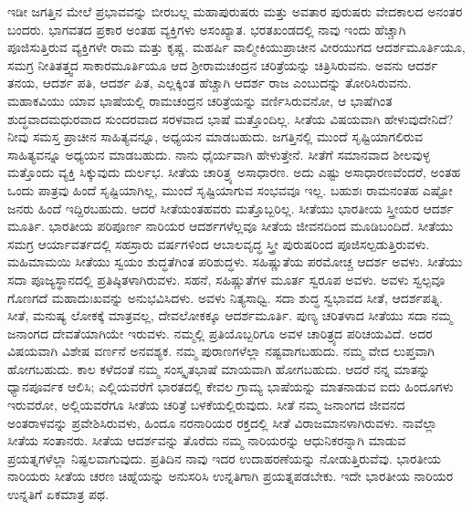 ಇಡೀ ಜಗತ್ತಿನ ಮೇಲೆ ಪ್ರಭಾವವನ್ನು ಬೀರಬಲ್ಲ ಮಹಾಪುರುಷರು ಮತ್ತು ಅವತಾರ ಪುರುಷರು ವೇದಕಾಲದ ಅನಂತರ ಬಂದರು. ಭಾಗವತದ ಪ್ರಕಾರ ಅಂತಹ ವ್ಯಕ್ತಿಗಳು ಅಸಂಖ್ಯಾತ. ಭರತಖಂಡದಲ್ಲಿ ನಾವು ಇಂದು ಹೆಚ್ಚಾಗಿ ಪೂಜಿಸುತ್ತಿರುವ ವ್ಯಕ್ತಿಗಳೇ ರಾಮ ಮತ್ತು ಕೃಷ್ಣ. ಮಹರ್ಷಿ ವಾಲ್ಮೀಕಿಯುಪ್ರಾಚೀನ ವೀರಯುಗದ ಆದರ್ಶಮೂರ್ತಿಯೂ, ಸಮಗ್ರ ನೀತಿತತ್ತ್ವದ ಸಾಕಾರಮೂರ್ತಿಯೂ ಆದ ಶ‍್ರೀರಾಮಚಂದ್ರನ ಚರಿತ್ರೆಯನ್ನು ಚಿತ್ರಿಸಿರುವನು. ಅವನು ಆದರ್ಶ ತನಯ, ಆದರ್ಶ ಪತಿ, ಆದರ್ಶ ಪಿತ, ಎಲ್ಲಕ್ಕಿಂತ ಹೆಚ್ಚಾಗಿ ಆದರ್ಶ ರಾಜ ಎಂಬುದನ್ನು ತೋರಿಸಿರುವನು. ಮಹಾಕವಿಯು ಯಾವ ಭಾಷೆಯಲ್ಲಿ ರಾಮಚಂದ್ರನ ಚರಿತ್ರೆಯನ್ನು ವರ್ಣಿಸಿರುವನೋ, ಆ ಭಾಷೆಗಿಂತ ಶುದ್ಧವಾದ\break ಮಧುರವಾದ ಸುಂದರವಾದ ಸರಳವಾದ ಭಾಷೆ ಮತ್ತೊಂದಿಲ್ಲ. ಸೀತೆಯ ವಿಷಯವಾಗಿ ಹೇಳುವುದೇನಿದೆ? ನೀವು ಸಮಸ್ತ ಪ್ರಾಚೀನ ಸಾಹಿತ್ಯವನ್ನೂ, ಅಧ್ಯಯನ ಮಾಡಬಹುದು. ಜಗತ್ತಿನಲ್ಲಿ ಮುಂದೆ ಸೃಷ್ಟಿಯಾಗಲಿರುವ ಸಾಹಿತ್ಯವನ್ನೂ ಅಧ್ಯಯನ ಮಾಡಬಹುದು. ನಾನು ಧೈರ್ಯವಾಗಿ ಹೇಳುತ್ತೇನೆ. ಸೀತೆಗೆ ಸಮಾನವಾದ ಶೀಲವುಳ್ಳ ಮತ್ತೊಂದು ವ್ಯಕ್ತಿ ಸಿಕ್ಕುವುದು ದುರ್ಲಭ. ಸೀತೆಯ ಚಾರಿತ್ರ್ಯ ಅಸಾಧಾರಣ. ಅದು ಎಷ್ಟು ಅಸಾಧಾರಣವೆಂದರೆ, ಅಂತಹ ಒಂದು ಪಾತ್ರವು ಹಿಂದೆ ಸೃಷ್ಟಿಯಾಗಿಲ್ಲ, ಮುಂದೆ ಸೃಷ್ಟಿಯಾಗುವ ಸಂಭವವೂ ಇಲ್ಲ. ಬಹುಶಃ ರಾಮನಂತಹ ಎಷ್ಟೋ ಜನರು ಹಿಂದೆ ಇದ್ದಿರಬಹುದು. ಆದರೆ ಸೀತೆಯಂತಹವರು ಮತ್ತೊಬ್ಬರಿಲ್ಲ. ಸೀತೆಯು ಭಾರತೀಯ ಸ್ತ್ರೀಯರ ಆದರ್ಶ ಮೂರ್ತಿ. ಭಾರತೀಯ ಪರಿಪೂರ್ಣ ನಾರಿಯರ ಆದರ್ಶಗಳೆಲ್ಲವೂ ಸೀತೆಯ ಜೀವನದಿಂದ ಮೂಡಿಬಂದಿದೆ. ಸೀತೆಯು ಸಮಗ್ರ ಆರ್ಯಾವರ್ತದಲ್ಲಿ ಸಹಸ್ರಾರು ವರ್ಷಗಳಿಂದ ಆಬಾಲವೃದ್ಧ ಸ್ತ್ರೀ ಪುರುಷರಿಂದ ಪೂಜಿಸಲ್ಪಡುತ್ತಿರುವಳು. ಮಹಿಮಾಮಯಿ ಸೀತೆಯು ಸ್ವಯಂ ಶುದ್ಧತೆಗಿಂತ ಪರಿಶುದ್ಧಳು. ಸಹಿಷ್ಣುತೆಯ ಪರಮೋಚ್ಚ ಆದರ್ಶ ಅವಳು. ಸೀತೆಯು ಸದಾ ಪೂಜ್ಯಸ್ಥಾನದಲ್ಲಿ ಪ್ರತಿಷ್ಠಿತಳಾಗಿರುವಳು. ಸಹನೆ, ಸಹಿಷ್ಣುತೆಗಳ ಮೂರ್ತ ಸ್ವರೂಪ ಅವಳು. ಅವಳು ಸ್ವಲ್ಪವೂ ಗೊಣಗದೆ ಮಹಾದುಃಖವನ್ನು ಅನುಭವಿಸಿದಳು. ಅವಳು ನಿತ್ಯಸಾಧ್ವಿ. ಸದಾ ಶುದ್ಧ ಸ್ವಭಾವದ ಸೀತೆ, ಆದರ್ಶಪತ್ನಿ. ಸೀತೆ, ಮನುಷ್ಯ ಲೋಕಕ್ಕೆ ಮಾತ್ರವಲ್ಲ, ದೇವಲೋಕಕ್ಕೂ ಆದರ್ಶಮೂರ್ತಿ. ಪುಣ್ಯ ಚರಿತಳಾದ ಸೀತೆಯು ಸದಾ ನಮ್ಮ ಜನಾಂಗದ ದೇವತೆಯಾಗಿಯೇ ಇರುವಳು. ನಮ್ಮಲ್ಲಿ ಪ್ರತಿಯೊಬ್ಬರಿಗೂ ಅವಳ ಚಾರಿತ್ರ್ಯದ ಪರಿಚಯವಿದೆ. ಅದರ ವಿಷಯವಾಗಿ ವಿಶೇಷ ವರ್ಣನೆ ಅನವಶ್ಯಕ. ನಮ್ಮ ಪುರಾಣಗಳೆಲ್ಲಾ ನಷ್ಟವಾಗಬಹುದು. ನಮ್ಮ ವೇದ ಲುಪ್ತವಾಗಿ ಹೋಗಬಹುದು. ಕಾಲ ಕಳೆದಂತೆ ನಮ್ಮ ಸಂಸ್ಕೃತಭಾಷೆ ಮಾಯವಾಗಿ ಹೋಗಬಹುದು. ಆದರೆ ನನ್ನ ಮಾತನ್ನು ಧ್ಯಾನಪೂರ್ವಕ ಆಲಿಸಿ; ಎಲ್ಲಿಯವರೆಗೆ ಭಾರತದಲ್ಲಿ ಕೇವಲ ಗ್ರಾಮ್ಯ ಭಾಷೆಯನ್ನು ಮಾತನಾಡುವ ಐದು ಹಿಂದೂಗಳು ಇರುವರೋ, ಅಲ್ಲಿಯವರೆಗೂ ಸೀತೆಯ ಚರಿತ್ರೆ ಬಳಕೆಯಲ್ಲಿರುವುದು. ಸೀತೆ ನಮ್ಮ ಜನಾಂಗದ ಜೀವನದ ಅಂತರಾಳವನ್ನು ಪ್ರವೇಶಿಸಿರುವಳು, ಹಿಂದೂ ನರನಾರಿಯರ ರಕ್ತದಲ್ಲಿ ಸೀತೆ ವಿರಾಜಮಾನಳಾಗಿರುವಳು. ನಾವೆಲ್ಲಾ ಸೀತೆಯ ಸಂತಾನರು. ಸೀತೆಯ ಆದರ್ಶವನ್ನು ತೊರೆದು ನಮ್ಮ ನಾರಿಯರನ್ನು ಆಧುನಿಕರನ್ನಾಗಿ ಮಾಡುವ ಪ್ರಯತ್ನಗಳೆಲ್ಲಾ ನಿಷ್ಫಲವಾಗುವುದು. ಪ್ರತಿದಿನ ನಾವು ಇದರ ಉದಾಹರಣೆಯನ್ನು ನೋಡುತ್ತಿರುವೆವು. ಭಾರತೀಯ ನಾರಿಯರು ಸೀತೆಯ ಚರಣ ಚಿಹ್ನೆಯನ್ನು ಅನುಸರಿಸಿ ಉನ್ನತಿಗಾಗಿ ಪ್ರಯತ್ನಪಡಬೇಕು. ಇದೇ ಭಾರತೀಯ ನಾರಿಯರ ಉನ್ನತಿಗೆ ಏಕಮಾತ್ರ ಪಥ. 

